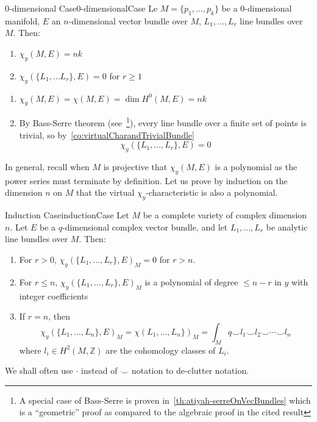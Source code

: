 \documentclass{book}
\newenvironment{Proof}[1][]
  {\begin{ProofTcb}[#1]}
  {\end{ProofTcb}}
\newcommand{\Z}{{\mathbb{Z}}}
\begin{document}
\begin{lem}{0-dimensional Case}{0-dimensionalCase}
  Le $M = \{p_1, ..., p_k\}$ be a $0$-dimensional manifold, $E$ an $n$-dimensional vector bundle over $M$, $L_1, ..., L_r$ line
  bundles over $M$. Then:
  \begin{enumerate}
    \item $\chi_y(M, E) = nk$
  \item $\chi_y(\{L_1, ... L_r\}, E) = 0$ for $r \ge 1$
  \end{enumerate}
\end{lem}

\begin{Proof}
  \begin{enumerate}
    \item $\chi_y(M, E) = \chi(M,E) = \dim H^0(M, E) = nk$
    \item By Bass-Serre theorem (see~\cite{NateKTheory}\footnote{A special case of
      Bass-Serre is proven in~\cref{th:atiyah-serreOnVecBundles} which is a ``geometric'' proof as compared to the
    algebraic proof in the cited result}), every line bundle over a finite set of points is trivial, so by~\cref{co:virtualCharandTrivialBundle}
    \[
      \chi_y(\{L_1, ..., L_r\}, E) = 0
    \]
  \end{enumerate}
\end{Proof}


In general, recall when $M$ is projective that $\chi_y(M,E)$ is a polynomial as the power series must terminate by definition. Let us prove by
induction on the dimension $n$ on $M$ that the virtual $\chi_y$-characteristic is also a polynomial.

\begin{thm}{Induction Case}{inductionCase}
  Let $M$ be a complete variety of complex dimension $n$. Let $E$ be a $q$-dimensional complex vector
  bundle, and let $L_1, ..., L_r$ be analytic line bundles over $M$. Then:
  \begin{enumerate}
    \item For $r > 0$, $\chi_y(\{L_1, ..., L_r\}, E)_M = 0$ for $r > n$.
    \item For $r \le n$, $\chi_y(\{L_1, ..., L_r\}, E)_M$ is a polynomial of degree $\le n-r$ in $y$ with
      integer coefficients
     \item If $r = n$, then
       \[
       \chi_y(\{L_1, ..., L_n\}, E)_M = \chi(L_1, ..., L_n\})_M = \int_M q\smile l_1\smile l_2\smile \cdots \smile
       l_n
       \]
       where $l_i \in H^2(M, \Z)$ are the cohomology classes of $L_i$.
  \end{enumerate}
\end{thm}
We shall often use $\cdot$ instead of $\smile$ notation to de-clutter notation.
\end{document}

